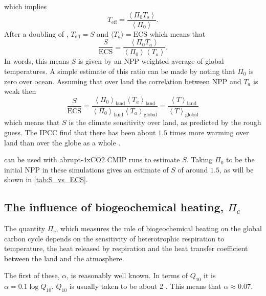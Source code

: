 which implies
\begin{equation}
  \label{eq:definition_of_effective_temperature}
  T_{\mathrm{eff}} = \frac{\left \langle \Pi_0 T_s \right\rangle}{\left \langle \Pi_0 \right\rangle}.
\end{equation}
After a doubling of , $T_{\mathrm{eff}} = S$ and $\langle T_a \rangle = \mathrm{ECS}$ which means that
\begin{equation}
  \label{eq:S_vs_ECS}
  \frac{S}{\mathrm{ECS}} = \frac{\left \langle \Pi_0 T_a \right\rangle}{\left \langle \Pi_0 \right\rangle \left \langle T_a \right \rangle}.
\end{equation}
In words, this means $S$ is given by an NPP weighted average of global temperatures. A simple estimate of this ratio can be made by noting that $\Pi_0$ is zero over ocean.
Assuming that over land the correlation between NPP and $T_a$ is weak then
\begin{equation}
  \label{eq:S_vs_ECS_land_ocean}
  \frac{S}{\mathrm{ECS}}
  = \frac{\left\langle \Pi_0\right\rangle_{\mathrm{land}} \left\langle T_a \right\rangle_{\mathrm{land}}}{\left \langle \Pi_0 \right\rangle_{\mathrm{land}} \left \langle T_a \right \rangle_{\mathrm{global}}}
  = \frac{\left\langle T\right\rangle_{\mathrm{land}}}{\left\langle T \right\rangle_{\mathrm{global}}}
\end{equation}
which means that $S$ is the climate sensitivity over land, as predicted by the rough guess. The IPCC find that there has been about $1.5$ times more warming over land than over the globe
as a whole \parencite{AR6}.

 can be used with abrupt-4xCO2 CMIP runs \parencite{Eyring2016} to estimate $S$. Taking $\Pi_0$ to be the initial NPP in these simulations gives an estimate of $S$ of around $1.5$,
as will be shown in \cref{tab:S_vs_ECS}.

\subsection{The influence of biogeochemical heating, $\Pi_c$}
The quantity $\Pi_c$, which measures the role of biogeochemical heating on the global carbon cycle depends on the sensitivity of heterotrophic respiration to
temperature, the heat released by respiration and the heat transfer coefficient between the land and the atmosphere.

The first of these, $\alpha$, is reasonably well known. In terms of $Q_{10}$ it is $\alpha = 0.1 \log Q_{10}$. $Q_{10}$ is usually taken to be about $2$
\parencite{Jones2001,Clark2011}. This means that $\alpha \approx 0.07$.


